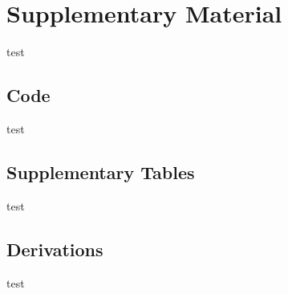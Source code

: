 \section{Supplementary Material}
\label{sec:appendix}
test

\subsection{Code}
test

\subsection{Supplementary Tables}
test

\subsection{Derivations}
test
